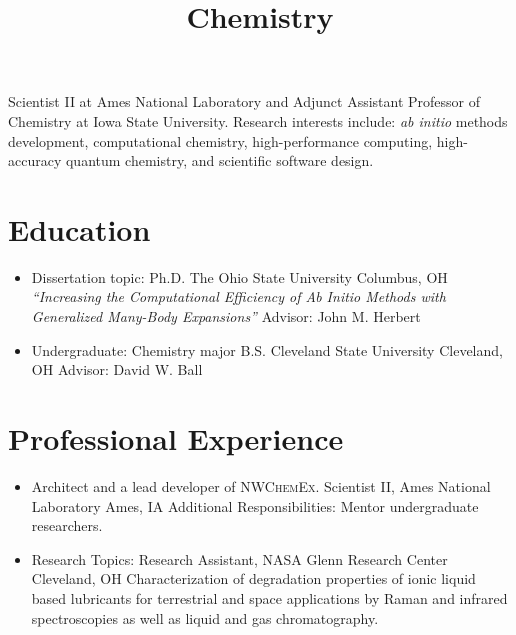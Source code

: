 \documentclass[11pt,a4paper,sans]{moderncv}
\title{Chemistry}
\begin{document}
\makecvtitle

\small{
	Scientist II at Ames National Laboratory and Adjunct Assistant
    Professor of Chemistry at Iowa State University.  Research interests
    include: \textit{ab initio} methods development, computational chemistry,
    high-performance computing, high-accuracy quantum chemistry, and scientific
	software design.
}


\section{Education}
\vspace{5pt}

\begin{itemize}
	\item{
		  {Dissertation topic:}
		  {Ph.D. The Ohio State University}
		  {Columbus, OH}
		  {}
		  {\textit{``Increasing the Computational Efficiency of Ab Initio
		  		 Methods with Generalized Many-Body Expansions''}}
 		  {Advisor:  John M. Herbert}
 		  {}}
	\item{
		  {Undergraduate: Chemistry major}
		  {B.S. Cleveland State University}
		  {Cleveland, OH}
		  {Advisor: David W. Ball}
		  {}}
\end{itemize}


\section{Professional Experience}
\vspace{5pt}
\begin{itemize}
	\item{
		  {Architect and a lead developer of \textsc{NWChemEx}.}
		  {Scientist II, Ames National Laboratory}
		  {Ames, IA}
		  {}
		  {Additional Responsibilities: Mentor undergraduate researchers.}}
	\item{
 		  {Research Topics:}
 		  {Research Assistant, NASA Glenn Research Center}
 		  {Cleveland, OH}
 		  {}
 		  {Characterization of degradation properties of ionic liquid based
 		   lubricants for terrestrial and space applications by Raman and
 		   infrared spectroscopies as well as liquid and gas chromatography.}
 	      {}}
\end{itemize}
\end{document}
